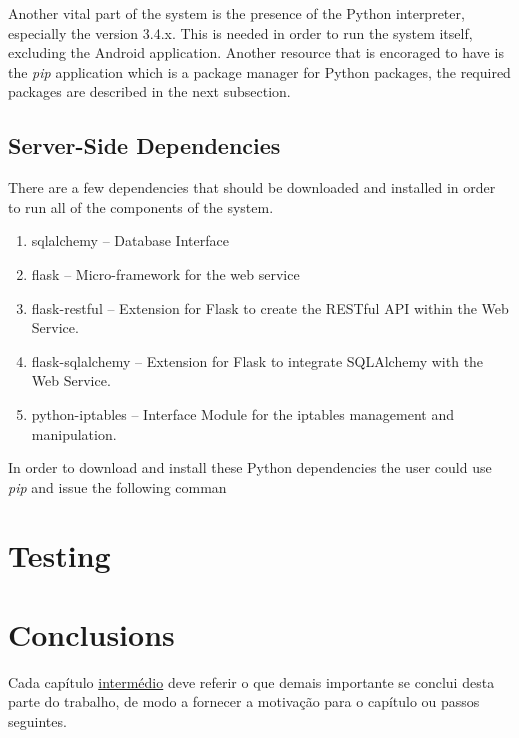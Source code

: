 Another vital part of the system is the presence of the Python interpreter,
especially the version 3.4.x. This is needed in order to run the system itself,
excluding the Android application. Another resource that is encoraged to have is
the \emph{pip} application which is a package manager for Python packages, the
required packages are described in the next subsection.

\subsection{Server-Side Dependencies}
\label{chap5:sec:inst-usg:sub:rasp-prep}
There are a few dependencies that should be downloaded and installed in order to
run all of the components of the system.

\begin{enumerate}
	\item sqlalchemy -- Database Interface
	\item flask -- Micro-framework for the web service
	\item flask-restful -- Extension for Flask to create the RESTful API within
		the Web Service.
	\item flask-sqlalchemy -- Extension for Flask to integrate SQLAlchemy with
		the Web Service.
	\item python-iptables -- Interface Module for the iptables management and
		manipulation.
\end{enumerate}

In order to download and install these Python dependencies the user could use
\emph{pip} and issue the following comman

\section{Testing}
\label{chap4:sec:testing}

\section{Conclusions}
\label{chap4:sec:concs}
Cada capítulo \underline{intermédio} deve referir o que demais importante se conclui desta parte do trabalho, de modo a fornecer a motivação para o capítulo ou passos seguintes.
